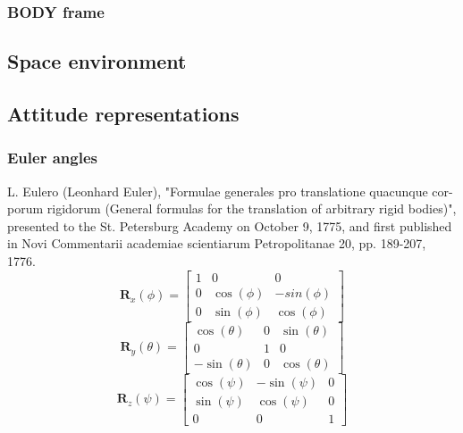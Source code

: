 \documentclass[12pt,a4paper,oneside]{article}
\begin{document}
\subsubsection{BODY frame}
\subsection{Space environment}
\subsection{Attitude representations}
\subsubsection{Euler angles}
L. Eulero (Leonhard Euler), "Formulae generales pro translatione quacunque cor-
porum rigidorum (General formulas for the translation of arbitrary rigid bodies)",
presented to the St. Petersburg Academy on October 9, 1775, and first published in
Novi Commentarii academiae scientiarum Petropolitanae 20, pp. 189-207, 1776.
\begin{equation}
\bm{R}_x(\phi) = \begin{bmatrix}
1 & 0 & 0 \\
0 & \cos(\phi) & -sin(\phi) \\
0 & \sin(\phi) & \cos(\phi)
\end{bmatrix}
\end{equation}
\begin{equation}
\bm{R}_y(\theta) = \begin{bmatrix}
\cos(\theta) & 0 & \sin(\theta) \\
0 & 1 & 0 \\
-\sin(\theta) & 0 & \cos(\theta)
\end{bmatrix}
\end{equation}
\begin{equation}
\bm{R}_z(\psi) = \begin{bmatrix}
\cos(\psi) & -\sin(\psi) & 0 \\
\sin(\psi) & \cos(\psi) & 0 \\
0 & 0 & 1
\end{bmatrix}
\end{equation}
\end{document}
